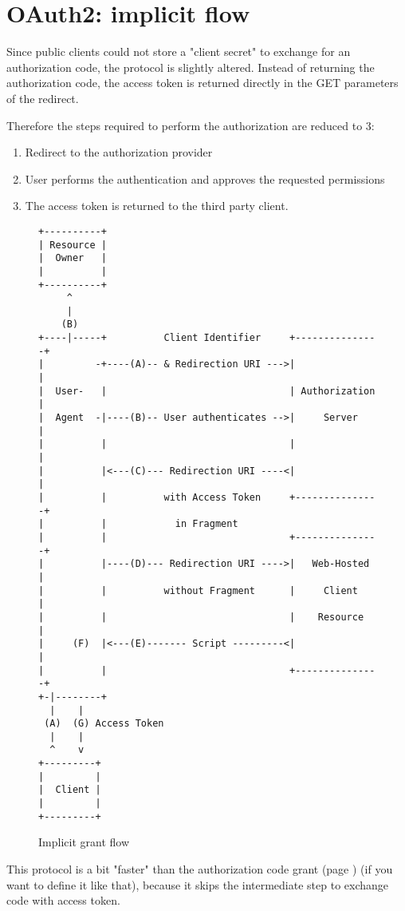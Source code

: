 \section{OAuth2: implicit flow}
\label{sec:implicit}
Since public clients could not store a "client secret" to exchange for an
authorization code, the protocol is slightly altered.
Instead of returning the authorization code, the access token is returned
directly in the GET parameters of the redirect.

Therefore the steps required to perform the authorization are reduced to 3:
\begin{enumerate}
    \item Redirect to the authorization provider
    \item User performs the authentication and approves the requested
        permissions
    \item The access token is returned to the third party client.
\end{enumerate}

\begin{figure}[h]
    \centering
    \begin{BVerbatim}
+----------+
| Resource |
|  Owner   |
|          |
+----------+
     ^
     |
    (B)
+----|-----+          Client Identifier     +---------------+
|         -+----(A)-- & Redirection URI --->|               |
|  User-   |                                | Authorization |
|  Agent  -|----(B)-- User authenticates -->|     Server    |
|          |                                |               |
|          |<---(C)--- Redirection URI ----<|               |
|          |          with Access Token     +---------------+
|          |            in Fragment
|          |                                +---------------+
|          |----(D)--- Redirection URI ---->|   Web-Hosted  |
|          |          without Fragment      |     Client    |
|          |                                |    Resource   |
|     (F)  |<---(E)------- Script ---------<|               |
|          |                                +---------------+
+-|--------+
  |    |
 (A)  (G) Access Token
  |    |
  ^    v
+---------+
|         |
|  Client |
|         |
+---------+
\end{BVerbatim}
    \caption{Implicit grant flow \cite{ietf-oauth}}
    \label{fig:authorization-implicit-grant-flow}
\end{figure}


This protocol is a bit "faster" than the authorization code grant (page \pageref{sec:auth-code}) (if you want to define it
like that), because it skips the intermediate step to exchange code with access
token.

